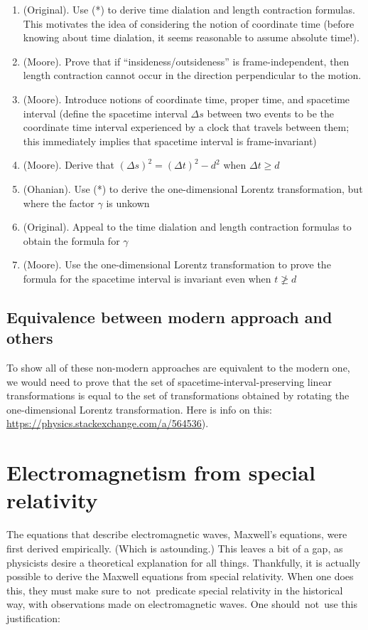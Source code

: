 \documentclass{article}
\begin{document}
\begin{enumerate}
	\item (Original). Use (*) to derive time dialation and length contraction formulas. This motivates the idea of considering the notion of coordinate time (before knowing about time dialation, it seems reasonable to assume absolute time!).
	\item (Moore). Prove that if ``insideness/outsideness'' is frame-independent, then length contraction cannot occur in the direction perpendicular to the motion.
	\item (Moore). Introduce notions of coordinate time, proper time, and spacetime interval (define the spacetime interval $\Delta s$ between two events to be the coordinate time interval experienced by a clock that travels between them; this immediately implies that spacetime interval is frame-invariant)
	\item (Moore). Derive that $(\Delta s)^2 = (\Delta t)^2 - d^2$ when $\Delta t \geq d$
	\item (Ohanian). Use (*) to derive the one-dimensional Lorentz transformation, but where the factor $\gamma$ is unkown
	\item (Original). Appeal to the time dialation and length contraction formulas to obtain the formula for $\gamma$
	\item (Moore). Use the one-dimensional Lorentz transformation to prove the formula for the spacetime interval is invariant even when $t \ngeq d$
\end{enumerate}

\subsection*{Equivalence between modern approach and others}

To show all of these non-modern approaches are equivalent to the modern one, we would need to prove that the set of spacetime-interval-preserving linear transformations is equal to the set of transformations obtained by rotating the one-dimensional Lorentz transformation. Here is info on this: \url{https://physics.stackexchange.com/a/564536}).

\section*{Electromagnetism from special relativity}

The equations that describe electromagnetic waves, Maxwell’s equations, were first derived empirically. (Which is astounding.) This leaves a bit of a gap, as physicists desire a theoretical explanation for all things. Thankfully, it is actually possible to derive the Maxwell equations from special relativity. When one does this, they must make sure to not predicate special relativity in the historical way, with observations made on electromagnetic waves. One should not use this justification:
\end{document}

